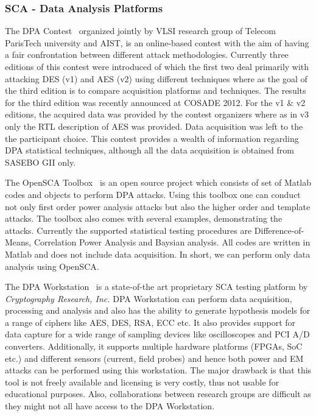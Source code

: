 \documentclass{llncs}
\numberwithin{algorithm}{chapter}
\begin{document}
\subsubsection{SCA - Data Analysis Platforms}\label{sec:SCAplat}
The DPA Contest~\cite{2023} organized jointly by VLSI research group of Telecom ParisTech university and AIST,
is an online-based contest with the aim of having a fair confrontation between different attack methodologies. 
Currently
three editions of this contest were introduced of which the first two deal primarily with
attacking DES (v1) and AES (v2) using different techniques where as the goal of the third edition is to
compare acquisition platforms and techniques. The results for the third edition was recently announced 
at COSADE 2012. For the v1 \& v2 editions, the acquired data was provided by the contest
organizers where as in v3 only the RTL description of AES was provided. Data acquisition was left to the 
the participant choice.  This contest provides a wealth of information regarding DPA statistical techniques,
although all the data acquisition is obtained from SASEBO GII only. 

The OpenSCA Toolbox~\cite{2022} is an open source project which consists of set of Matlab codes and objects
to perform DPA attacks. Using this toolbox one can conduct  not only first order power analysis attacks
but also the higher order and template attacks. The toolbox also comes with several examples, demonstrating
the attacks. Currently the supported statistical testing procedures are Difference-of-Means, 
Correlation Power Analysis and Baysian analysis. All codes are written in Matlab and does not
include data acquisition. In short, we can perform only data analysis using OpenSCA.  

The DPA Workstation\texttrademark~\cite{2024} is a state-of-the art proprietary SCA testing  
platform by \emph{Cryptography Research, Inc.} DPA Workstation\texttrademark
can perform data acquisition, processing and analysis and also has the ability to
generate hypothesis models for a range of ciphers like AES, DES, RSA, ECC etc. It also provides 
support for data capture for a wide range of sampling devices like oscilloscopes and
PCI A/D converters. Additionally, it supports multiple hardware platforms (FPGAs, SoC etc.) and different
sensors (current, field probes) and hence both power and EM attacks can be performed using this workstation.
The major drawback is that this tool is not freely available and licensing is very costly, thus 
not usable for educational purposes. Also, collaborations between research groups are difficult as they
might not all have access to the DPA Workstation\texttrademark.
\end{document}
